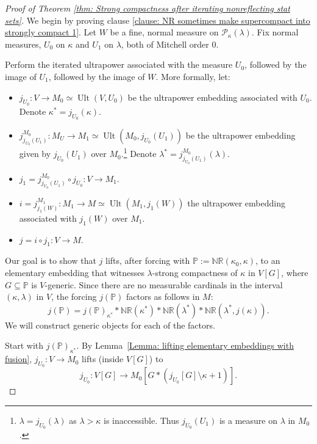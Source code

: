 \documentclass[11pt]{amsart}
\theoremstyle{definition}
\theoremstyle{remark}
\newcommand\<{{<}}
\DeclareMathOperator{\Ult}{Ult}
\def\s{\subseteq}
\newcommand{\po}{\mathbb{P}}
\begin{document}
\begin{proof}[Proof of Theorem \ref{thm: Strong compactness after iterating nonreflecting stat sets}]

We begin by proving clause \eqref{clause: NR sometimes make supercompact into strongly compact 1}. 
Let $W$ be a fine, normal measure on $\mathcal{P}_\kappa(\lambda)$. 
Fix normal measures,  $U_0$ on $\kappa$ and $U_1$ on $\lambda$, both of Mitchell order $0$.

\smallskip

Perform the iterated ultrapower associated with the measure $U_0$, followed by the image of $U_1$, followed by the image of $W$. More formally, let:
\begin{itemize}
    \item $j_{U_0}\colon V\rightarrow M_0\simeq \Ult(V,U_0)$ be the ultrapower embedding associated with $U_0$. Denote $\kappa^* = j_{U_0}(\kappa)$. 
    \item $j^{M_0}_{j_{U_0}(U_1)}\colon M_U \rightarrow M_1 \simeq \Ult( M_0, j_{U_0}(U_1) )$ be the ultrapower embedding given by $j_{U_0}(U_1)$ over $M_0$.\footnote{
     $\lambda = j_{U_0}(\lambda)$ as $\lambda> \kappa$ is inaccessible. Thus $j_{U_0}(U_1)$ is a measure on $\lambda$ in $M_{0}$.} Denote $\lambda^* = j^{M_0}_{j_{U_0}(U_1)}(\lambda)$. 
    \item $j_{1} = j^{M_0}_{j_{U_0}(U_1)} \circ j_{U_0}\colon V\to M_{1}$.
    \item $i = j^{M_1}_{j_1(W)}\colon M_1\rightarrow M\simeq \Ult(M_1, j_1(W))$ the ultrapower embedding associated with $j_1(W)$ over $M_1$. 
    \item $j = i\circ j_1 \colon V\rightarrow M$.
\end{itemize}
Our goal is to show that $j$ lifts, after forcing with $\mathbb{P}:=\mathbb{NR}(\kappa_0, \kappa)$, to an elementary embedding that witnesses $\lambda$-strong compactness of $\kappa$ in $V[G]$, where $G\s \mathbb{P}$ is $V$-generic. Since there are no measurable cardinals in the interval $(\kappa, \lambda)$ in $V$, the forcing $j(\po)$ factors as follows in $M$:
$$ j(\po) = {j(\po)_{\kappa^*}} \ast {\mathbb{NR}(\kappa^*)} \ast {\mathbb{NR}(\lambda^*)} \ast {\mathbb{NR}(\lambda^*, j(\kappa))}.$$
We will construct generic objects for each of the factors.

Start with $j(\po)_{\kappa^*}$. By Lemma~\ref{Lemma: lifting elementary embeddings with fusion}, $j_{U_0}\colon V\rightarrow M_0$ lifts (inside $V[G]$) to $$j_{U_0}\colon V[G]\rightarrow M_0[G\ast (j_{U_0}[G]\setminus \kappa+1)].$$


\end{proof}
\end{document}

